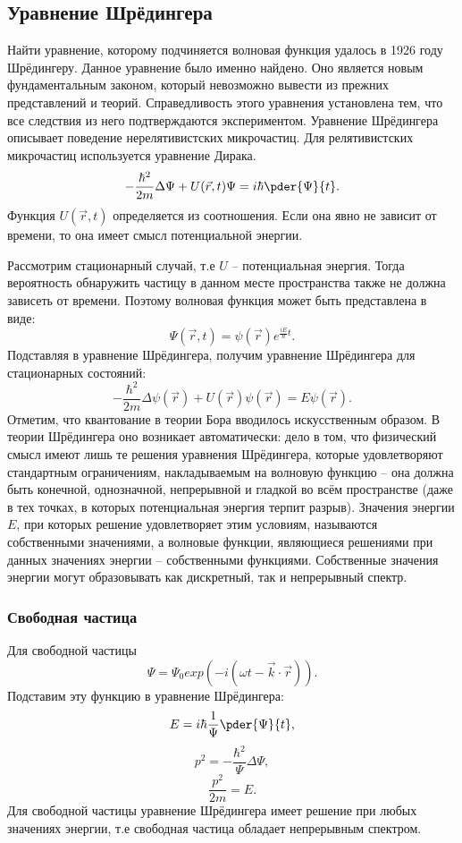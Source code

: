 \subsection{Уравнение Шрёдингера}
Найти уравнение, которому подчиняется волновая функция удалось в 1926 году
Шрёдингеру. Данное уравнение было именно найдено. Оно является новым
фундаментальным законом, который невозможно вывести из прежних представлений
и теорий. Справедливость этого уравнения установлена тем, что все следствия из
него подтверждаются экспериментом. Уравнение Шрёдингера описывает поведение
нерелятивистских микрочастиц. Для релятивистских микрочастиц используется
уравнение Дирака.
\[
    -\frac{\hbar^2}{2m}\Delta\Psi + U(\vec{r}, t)\Psi = i\hbar\pder{\Psi}{t}.
\]
Функция \( U(\vec{r}, t) \) определяется из соотношения. Если она явно не
зависит от времени, то она имеет смысл потенциальной энергии.

Рассмотрим стационарный случай, т.е \( U \) -- потенциальная энергия. Тогда
вероятность обнаружить частицу в данном месте пространства также не должна
зависеть от времени. Поэтому волновая функция может быть представлена в виде:
\[
    \Psi(\vec{r}, t) = \psi(\vec{r}) e^{\frac{iE}{\hbar}t}.
\]
Подставляя в уравнение Шрёдингера, получим уравнение Шрёдингера для стационарных
состояний:
\begin{equation}
    -\frac{\hbar^2}{2m}\Delta\psi(\vec{r}) + U(\vec{r})\psi(\vec{r}) =
    E\psi(\vec{r}).
\end{equation}
Отметим, что квантование в теории Бора вводилось искусственным образом. В теории
Шрёдингера оно возникает автоматически: дело в том, что физический смысл имеют
лишь те решения уравнения Шрёдингера, которые удовлетворяют стандартным
ограничениям, накладываемым на волновую функцию -- она должна быть конечной,
однозначной, непрерывной и гладкой во всём пространстве (даже в тех точках,
в которых потенциальная энергия терпит разрыв). Значения энергии \(E\),
при которых решение удовлетворяет этим условиям, называются собственными
значениями, а волновые функции, являющиеся решениями при данных значениях
энергии -- собственными функциями. Собственные значения энергии могут
образовывать как дискретный, так и непрерывный спектр.

\subsubsection{Свободная частица}
Для свободной частицы
\[
    \Psi = \Psi_0 exp(-i(\omega t - \vec{k}\cdot\vec{r})).
\]
Подставим эту функцию в уравнение Шрёдингера:
\begin{equation}
     E = i\hbar\frac{1}{\Psi}\pder{\Psi}{t},
\end{equation} 
\begin{equation}
     p^2 = -\frac{\hbar^2}{\Psi}\Delta\Psi,
\end{equation}
\begin{equation}
     \frac{p^2}{2m} = E.
\end{equation}
Для свободной частицы уравнение Шрёдингера имеет решение при любых значениях
энергии, т.е свободная частица обладает непрерывным спектром.

